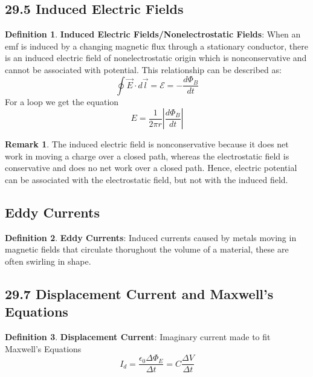 \documentclass[12pt]{amsart}
\theoremstyle{definition}
\newtheorem{definition}{Definition} %
\newtheorem*{remark}{Remark}        %
\numberwithin{equation}{theorem}    %
\begin{document}
\subsection*{29.5 Induced Electric Fields}
\begin{definition}
    \textbf{Induced Electric Fields/Nonelectrostatic Fields}:
    When an emf is induced by a changing magnetic flux through a stationary conductor, there is an induced electric field of nonelectrostatic origin which is nonconservative and cannot be associated with potential. This relationship can be described as: 
    $$\oint \vec{E} \cdot d\vec{l} = \mathcal{E} = -\frac{d\Phi_B}{dt}$$
    For a loop we get the equation $$E = \frac{1}{2\pi r}{|\frac{d\Phi_B}{dt}|}$$

    \begin{remark}
        The induced electric field is nonconservative because it does net work in moving a charge over a closed path, whereas the electrostatic field is conservative and does no net work over a closed path. Hence, electric potential can be associated with the electrostatic field, but not with the induced field.
    \end{remark}
\end{definition}

\subsection*{Eddy Currents}

\begin{definition}
    \textbf{Eddy Currents}:
    Induced currents caused by metals moving in magnetic fields that circulate thorughout the volume of a material, these are often swirling in shape. 
\end{definition}

\subsection*{29.7 Displacement Current and Maxwell's Equations}

\begin{definition}
    \textbf{Displacement Current}:
    Imaginary current made to fit Maxwell's Equations
    $$I_d = \frac{\epsilon_0 \Delta \Phi_E}{\Delta t} = C\frac{\Delta V}{\Delta t}$$
\end{definition}
\end{document}
